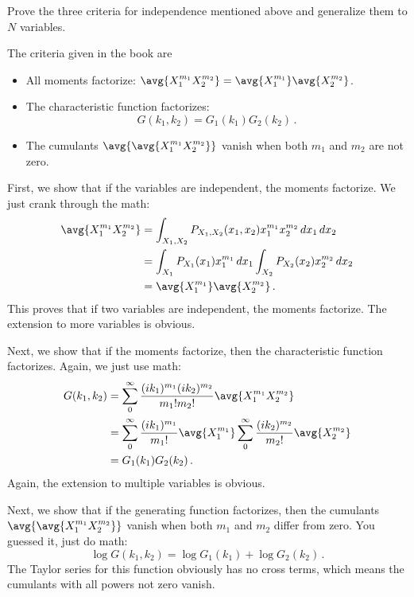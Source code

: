 

Prove the three criteria for independence mentioned above and generalize them to $N$ variables.

The criteria given in the book are
\begin{itemize}
\item All moments factorize: $\avg{X_1^{m_1} X_2^{m_2}} = \avg{X_1^{m_1}} \avg{X_2^{m_2}}$.
\item The characteristic function factorizes:
\begin{equation*}
G(k_1, k_2) = G_1(k_1)G_2(k_2) \, .
\end{equation*}
\item The cumulants $\avg{\avg{X_1^{m_1} X_2^{m_2}}}$ vanish when both $m_1$ and $m_2$ are not zero.
\end{itemize}


First, we show that if the variables are independent, the moments factorize.
We just crank through the math:
\begin{align*}
\avg{X_1^{m_1} X_2^{m_2}}
&= \int_{X_1,X_2} P_{X_1, X_2}(x_1, x_2) x_1^{m_1} x_2^{m_2} \, dx_1 \, dx_2 \\
&= \int_{X_1} P_{X_1}(x_1) x_1^{m_1} \, dx_1 \int_{X_2} P_{X_2}(x_2) x_2^{m_2} \, dx_2 \\
&= \avg{X_1^{m_1}} \avg{X_2^{m_2}} \, .
\end{align*}
This proves that if two variables are independent, the moments factorize.
The extension to more variables is obvious.

Next, we show that if the moments factorize, then the characteristic function factorizes.
Again, we just use math:
\begin{align*}
G(k_1, k_2)
&= \sum_0^{\infty} \frac{(ik_1)^{m_1} (ik_2)^{m_2}}{m_1! m_2!} \avg{X_1^{m_1} X_2^{m_2}} \\
&=
\sum_0^{\infty} \frac{(ik_1)^{m_1}}{m_1!} \avg{X_1^{m_1}}
\sum_0^{\infty} \frac{(ik_2)^{m_2}}{m_2!} \avg{X_2^{m_2}} \\
&= G_1(k_1) G_2(k_2) \, .
\end{align*}
Again, the extension to multiple variables is obvious.

Next, we show that if the generating function factorizes, then the cumulants $\avg{\avg{X_1^{m_1} X_2^{m_2}}}$ vanish when both $m_1$ and $m_2$ differ from zero.
You guessed it, just do math:
\begin{equation*}
\log G(k_1, k_2)
= \log G_1(k_1) + \log G_2(k_2) \, .
\end{equation*}
The Taylor series for this function obviously has no cross terms, which means the cumulants with all powers not zero vanish.

